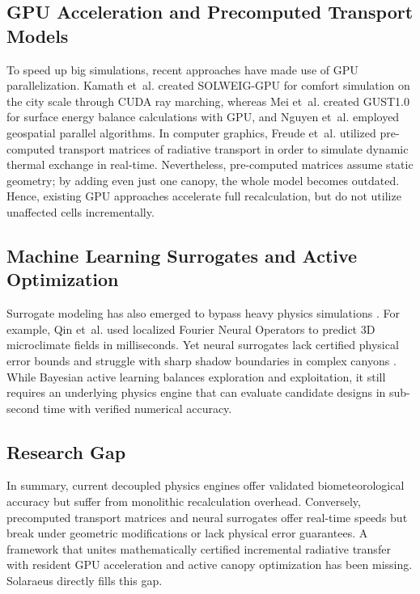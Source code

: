 \documentclass[conference]{IEEEtran}
\begin{document}
\subsection{GPU Acceleration and Precomputed Transport Models}
To speed up big simulations, recent approaches have made use of GPU parallelization. Kamath et~al. \cite{kamath2026solweig} created SOLWEIG-GPU for comfort simulation on the city scale through CUDA ray marching, whereas Mei et~al. \cite{mei2025gust1} created GUST1.0 for surface energy balance calculations with GPU, and Nguyen et~al. \cite{nguyen2023mathematical} employed geospatial parallel algorithms. In computer graphics, Freude et~al. \cite{freude2025inverse,freude2023precomputed} utilized pre-computed transport matrices of radiative transport in order to simulate dynamic thermal exchange in real-time. Nevertheless, pre-computed matrices assume static geometry; by adding even just one canopy, the whole model becomes outdated. Hence, existing GPU approaches accelerate full recalculation, but do not utilize unaffected cells incrementally.

\subsection{Machine Learning Surrogates and Active Optimization}
Surrogate modeling has also emerged to bypass heavy physics simulations \cite{do2024geospatial,tao2025integrating}. For example, Qin et~al. \cite{qin2024modeling} used localized Fourier Neural Operators to predict 3D microclimate fields in milliseconds. Yet neural surrogates lack certified physical error bounds and struggle with sharp shadow boundaries in complex canyons \cite{tao2025integrating}. While Bayesian active learning balances exploration and exploitation, it still requires an underlying physics engine that can evaluate candidate designs in sub-second time with verified numerical accuracy.

\subsection{Research Gap}
In summary, current decoupled physics engines offer validated biometeorological accuracy but suffer from monolithic recalculation overhead. Conversely, precomputed transport matrices and neural surrogates offer real-time speeds but break under geometric modifications or lack physical error guarantees. A framework that unites mathematically certified incremental radiative transfer with resident GPU acceleration and active canopy optimization has been missing. Solaraeus directly fills this gap.
\end{document}
